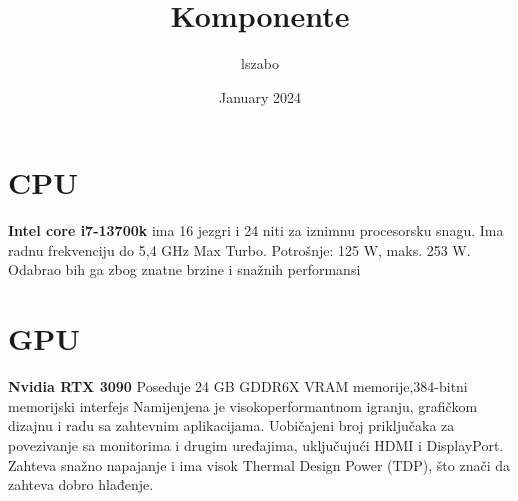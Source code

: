 \documentclass{article}
\title{Komponente}
\author{lszabo }
\date{January 2024}
\begin{document}
\maketitle

\section{CPU}
\textbf{Intel core i7-13700k} 
ima 16 jezgri i 24 niti za iznimnu procesorsku snagu. Ima radnu frekvenciju do 5,4 GHz Max Turbo.
Potrošnje: 125 W, maks. 253 W. Odabrao bih ga zbog znatne brzine i snažnih performansi

\maketitle
\section {GPU}
\textbf{Nvidia RTX 3090}
Poseduje 24 GB GDDR6X VRAM memorije,384-bitni memorijski interfejs
Namijenjena je visokoperformantnom igranju, grafičkom dizajnu i radu sa zahtevnim aplikacijama.
Uobičajeni broj priključaka za povezivanje sa monitorima i drugim uređajima, uključujući HDMI i DisplayPort. Zahteva snažno napajanje i ima visok Thermal Design Power (TDP), što znači da zahteva dobro hlađenje.
\end{document}
